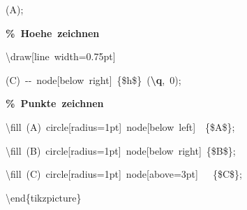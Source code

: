 {{\rule[-0.5ex]{0pt}{2.5ex}\hspace*{3.5em}(A);\\
\rule[-0.5ex]{0pt}{2.5ex}\hspace*{1.0em}\textcolor{G}{\textbf{\%~Hoehe~zeichnen}}\\
\rule[-0.5ex]{0pt}{2.5ex}\hspace*{1.0em}\textbackslash{}draw[line~width=0.75pt]\\
\rule[-0.5ex]{0pt}{2.5ex}\hspace*{3.5em}(C)~{-}{-}~node[below~right]~\{\$h\$\}~(\textcolor{B}{\textbf{\textbackslash{}q}},~0);\\
\rule[-0.5ex]{0pt}{2.5ex}\hspace*{1.0em}\textcolor{G}{\textbf{\%~Punkte~zeichnen}}\\
\rule[-0.5ex]{0pt}{2.5ex}\hspace*{1.0em}\textbackslash{}fill~(A)~circle[radius=1pt]~node[below~left]~~\{\$A\$\};\\
\rule[-0.5ex]{0pt}{2.5ex}\hspace*{1.0em}\textbackslash{}fill~(B)~circle[radius=1pt]~node[below~right]~\{\$B\$\};\\
\rule[-0.5ex]{0pt}{2.5ex}\hspace*{1.0em}\textbackslash{}fill~(C)~circle[radius=1pt]~node[above=3pt]~~~\{\$C\$\};\\
\rule[-0.5ex]{0pt}{2.5ex}\hspace*{0.0em}\textbackslash{}end\{tikzpicture\}}%
}%
\endgroup
